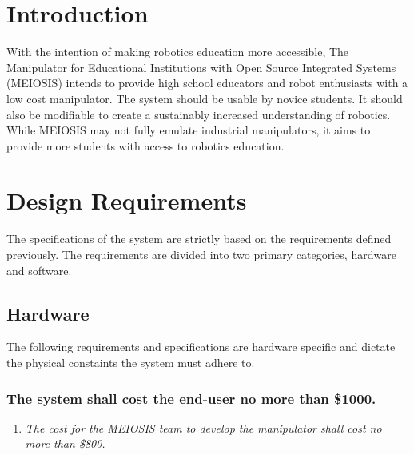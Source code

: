 \documentclass[12pt]{report}
\begin{document}
\normalem

{\tableofcontents\let\clearpage\relax\listoffigures}
\clearpage
\newpage


{}

\section{Introduction}
\raggedright
With the intention of making robotics education more accessible, The Manipulator for Educational Institutions with Open Source Integrated Systems (MEIOSIS) intends to provide high school educators and robot enthusiasts with a low cost manipulator. The system should be usable by novice students. It should also be modifiable to create a sustainably increased understanding of robotics. While MEIOSIS may not fully emulate industrial manipulators, it aims to provide more students with access to robotics education.

\section{Design Requirements}
The specifications of the system are strictly based on the requirements defined previously. The requirements are divided into two primary categories, hardware and software.
\vspace{-\baselineskip}
\subsection{Hardware}
The following requirements and specifications are hardware specific and dictate the physical constaints the system must adhere to.
\vspace{-\baselineskip}
\subsubsection{The system shall cost the end-user no more than \$1000.}
\begin{enumerate}[label=\thesubsubsection.\alph*,leftmargin=3cm,font=\itshape]
  \item \textit{The cost for the MEIOSIS team to develop the manipulator shall cost no more than \$800.}
\end{enumerate}
\end{document}
